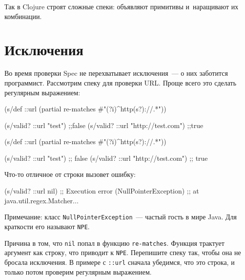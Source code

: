 Так в Clojure строят сложные спеки: объявляют примитивы и~наращивают их
комбинации.

\section{Исключения}


Во время проверки Spec не перехватывает исключения~--- о них заботится
программист. Рассмотрим спеку для проверки URL. Проще всего это сделать
регулярным выражением:


\ifx\devicetype\mobile

\begin{english}
  \begin{clojure}
(s/def ::url
  (partial
    re-matches #"(?i)^http(s?)://.*"))

(s/valid? ::url "test") ;;false
(s/valid? ::url "http://test.com") ;;true
  \end{clojure}
\end{english}

\else

\begin{english}
  \begin{clojure}
(s/def ::url
  (partial re-matches #"(?i)^http(s?)://.*"))

(s/valid? ::url "test")            ;; false
(s/valid? ::url "http://test.com") ;; true
  \end{clojure}
\end{english}

\fi

Что-то отличное от строки вызовет ошибку:


\begin{english}
  \begin{clojure}
(s/valid? ::url nil)
;; Execution error (NullPointerException)
;; at java.util.regex.Matcher...
  \end{clojure}
\end{english}


Примечание: класс \verb|NullPointerException|~--- частый гость в мире Java. Для
краткости его называют \verb|NPE|.

Причина в том, что \verb|nil| попал в функцию \verb|re-matches|. Функция
трактует аргумент как строку, что приводит к \verb|NPE|. Перепишите спеку так,
чтобы она не бросала исключения. В примере с \verb|::url| сначала убедимся,
что это строка, и только потом проверим регулярным выражением.

